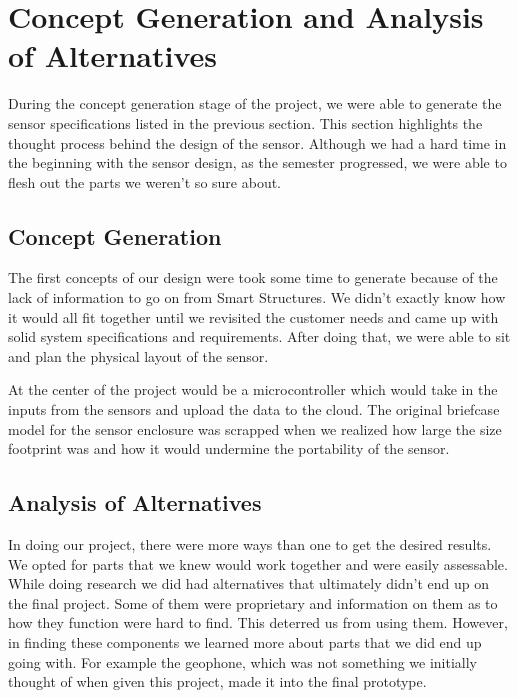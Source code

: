 \documentclass[11pt]{article}
\begin{document}
\section{Concept Generation and Analysis of Alternatives}

During the concept generation stage of the project, we were able to generate the sensor specifications listed in the previous section. This section highlights the thought process behind the design of the sensor. Although we had a hard time in the beginning with the sensor design, as the semester progressed, we were able to flesh out the parts we weren't so sure about.

\subsection{Concept Generation}
The first concepts of our design were took some time to generate because of the lack of information to go on from Smart Structures. We didn't exactly know how it would all fit together until we revisited the customer needs and came up with solid system specifications and requirements. After doing that, we were able to sit and plan the physical layout of the sensor. 

At the center of the project would be a microcontroller which would take in the inputs from the sensors and upload the data to the cloud. The original briefcase model for the sensor enclosure was scrapped when we realized how large the size footprint was and how it would undermine the portability of the sensor.


\subsection{Analysis of Alternatives}

In doing our project, there were more ways than one to get the desired results. We opted for parts that we knew would work together and were easily assessable.  While doing research we did had alternatives that ultimately didn't end up on the final project. Some of them were proprietary and information on them as to how they function were hard to find. This deterred us from using them. However, in finding these components we learned more about parts that we did end up going with. For example the geophone, which was not something we initially thought of when given this project, made it into the final prototype.
	
\end{document}
